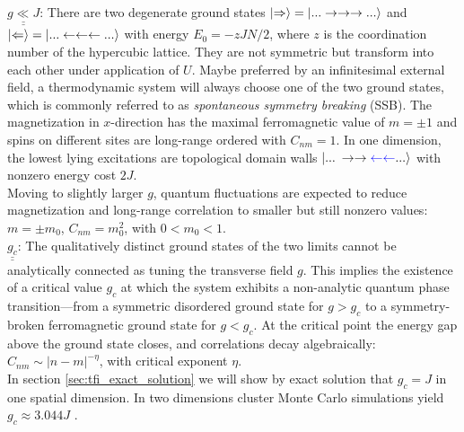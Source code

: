 \noindent $\underline{\underline{g \ll J}}$: There are two degenerate ground states $\ket{\Rightarrow} = \ket{... \rightarrow \rightarrow \rightarrow ...}$ and $\ket{\Leftarrow} = \ket{... \leftarrow \leftarrow \leftarrow ...}$ with energy $E_0 = - zJN/2$, where $z$ is the coordination number of the hypercubic lattice. They are not symmetric but transform into each other under application of $U$. Maybe preferred by an infinitesimal external field, a thermodynamic system will always choose one of the two ground states, which is commonly referred to as \textit{spontaneous symmetry breaking} (SSB). The magnetization in $x$-direction has the maximal ferromagnetic value of $m = \pm 1$ and spins on different sites are long-range ordered with $C_{nm} = 1$. In one dimension, the lowest lying excitations are topological domain walls $\ket{... \: \rightarrow \rightarrow \textcolor{blue}{\leftarrow \leftarrow} ...}$ with nonzero energy cost $2J$. \\
Moving to slightly larger $g$, quantum fluctuations are expected to reduce magnetization and long-range correlation to smaller but still nonzero values: $m = \pm m_0$, $C_{nm} = m_0^2$, with $0 < m_0 < 1$. \\
	
\noindent $\underline{\underline{g_c}}$: The qualitatively distinct ground states of the two limits cannot be analytically connected as tuning the transverse field $g$. This implies the existence of a critical value $g_c$ at which the system exhibits a non-analytic quantum phase transition---from a symmetric disordered ground state for $g > g_c$ to a symmetry-broken ferromagnetic ground state for $g < g_c$. At the critical point the energy gap above the ground state closes, and correlations decay algebraically: $C_{nm} \sim \vert n - m \vert^{-\eta}$, with critical exponent $\eta$. \\
In section \ref{sec:tfi_exact_solution} we will show by exact solution that $g_c = J$ in one spatial dimension. In two dimensions cluster Monte Carlo simulations yield $g_c \approx 3.044 J$ \cite{blote2002cluster}.

